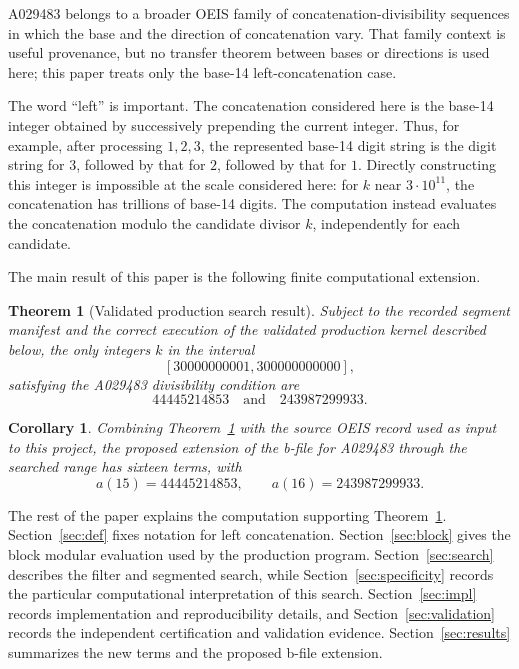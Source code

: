 \documentclass[11pt]{article}
\newtheorem{theorem}{Theorem}
\newtheorem{corollary}{Corollary}
\theoremstyle{definition}
\theoremstyle{remark}
\begin{document}
A029483 belongs to a broader OEIS family of concatenation-divisibility
sequences in which the base and the direction of concatenation vary.  That
family context is useful provenance, but no transfer theorem between bases or
directions is used here; this paper treats only the base-14 left-concatenation
case.

The word ``left'' is important.  The concatenation considered here is the
base-14 integer obtained by successively prepending the current integer.
Thus, for example, after processing \(1,2,3\), the represented base-14 digit
string is the digit string for \(3\), followed by that for \(2\), followed by
that for \(1\).  Directly constructing this integer is impossible at the
scale considered here: for \(k\) near \(3\cdot 10^{11}\), the concatenation
has trillions of base-14 digits.  The computation instead evaluates the
concatenation modulo the candidate divisor \(k\), independently for each
candidate.

The main result of this paper is the following finite computational
extension.

\begin{theorem}[Validated production search result]
\label{thm:main}
Subject to the recorded segment manifest and the correct execution of the
validated production kernel described below, the only integers \(k\) in the
interval
\[
  [30000000001,300000000000],
\]
satisfying the A029483 divisibility condition are
\[
  44445214853 \quad\text{and}\quad 243987299933.
\]
\end{theorem}

\begin{corollary}
\label{cor:bfile}
Combining Theorem~\ref{thm:main} with the source OEIS record used as input
to this project, the proposed extension of the b-file for A029483 through the
searched range has sixteen terms, with
\[
  a(15)=44445214853,\qquad a(16)=243987299933.
\]
\end{corollary}

The rest of the paper explains the computation supporting
Theorem~\ref{thm:main}.  Section~\ref{sec:def} fixes notation for left
concatenation.  Section~\ref{sec:block} gives the block modular evaluation
used by the production program.  Section~\ref{sec:search} describes the
filter and segmented search, while Section~\ref{sec:specificity} records the
particular computational interpretation of this search.  Section~\ref{sec:impl}
records implementation and reproducibility details, and
Section~\ref{sec:validation} records the independent certification and
validation evidence.
Section~\ref{sec:results} summarizes the new terms and the proposed b-file
extension.
\end{document}
